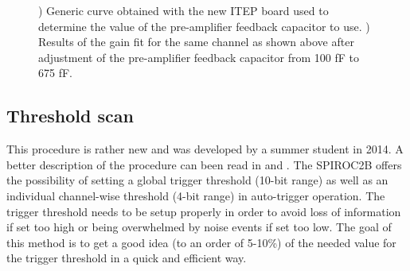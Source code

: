 \begin{figure}[htbp!]
\begin{subfigure}[t]{0.49\textwidth}
    \caption{} \label{fig:Gain675fF}
  \end{subfigure}
  \caption{) Generic curve obtained with the new ITEP board used to determine the value of the pre-amplifier feedback capacitor to use. ) Results of the gain fit for the same channel as shown above after adjustment of the pre-amplifier feedback capacitor from 100 fF to 675 fF.}
\end{figure}

\subsection{Threshold scan}

This procedure is rather new and was developed by a summer student in 2014. A better description of the procedure can been read in \cite{Hartbrich:2016bbz} and \cite{LloydTrigger}. The SPIROC2B offers the possibility of setting a global trigger threshold (10-bit range) as well as an individual channel-wise threshold (4-bit range) in auto-trigger operation. The trigger threshold needs to be setup properly in order to avoid loss of information if set too high or being overwhelmed by noise events if set too low. The goal of this method is to get a good idea (to an order of 5-10\%) of the needed value for the trigger threshold in a quick and efficient way.

